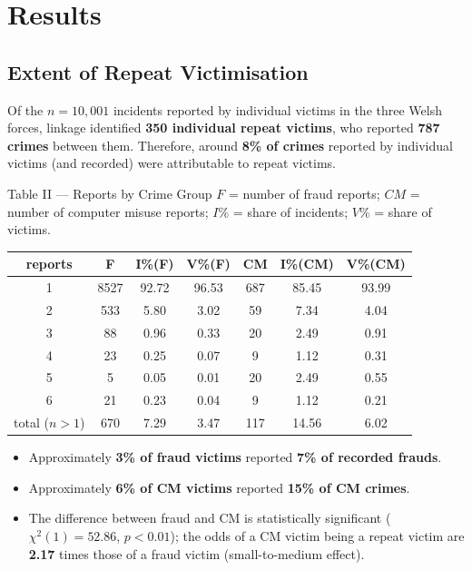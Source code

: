 \documentclass[11pt,a4paper,openany]{report}
\theoremstyle{definition}
\theoremstyle{plain}
\theoremstyle{remark}
\begin{document}
\section{Results}

\subsection{Extent of Repeat Victimisation}

Of the $n = 10{,}001$ incidents reported by individual victims in the three Welsh forces, linkage identified \textbf{350 individual repeat victims}, who reported \textbf{787 crimes} between them. Therefore, around \textbf{8\% of crimes} reported by individual victims (and recorded) were attributable to repeat victims.

\begin{datapanel}{Table II --- Reports by Crime Group}
$F$ = number of fraud reports; $CM$ = number of computer misuse reports; $I\%$ = share of incidents; $V\%$ = share of victims.
\begin{center}
\begin{tabular}{ccccccc}
\toprule
\textbf{reports} & \textbf{F} & \textbf{I\%(F)} & \textbf{V\%(F)} & \textbf{CM} & \textbf{I\%(CM)} & \textbf{V\%(CM)} \\
\midrule
1 & 8527 & 92.72 & 96.53 & 687 & 85.45 & 93.99 \\
2 & 533  & 5.80  & 3.02  & 59  & 7.34  & 4.04 \\
3 & 88   & 0.96  & 0.33  & 20  & 2.49  & 0.91 \\
4 & 23   & 0.25  & 0.07  & 9   & 1.12  & 0.31 \\
5 & 5    & 0.05  & 0.01  & 20  & 2.49  & 0.55 \\
6 & 21   & 0.23  & 0.04  & 9   & 1.12  & 0.21 \\
\midrule
total ($n>1$) & 670 & 7.29 & 3.47 & 117 & 14.56 & 6.02 \\
\bottomrule
\end{tabular}
\end{center}
\end{datapanel}

\begin{itemize}
    \item Approximately \textbf{3\% of fraud victims} reported \textbf{7\% of recorded frauds}.
    \item Approximately \textbf{6\% of CM victims} reported \textbf{15\% of CM crimes}.
    \item The difference between fraud and CM is statistically significant ($\chi^2(1) = 52.86$, $p < 0.01$); the odds of a CM victim being a repeat victim are \textbf{2.17} times those of a fraud victim (small-to-medium effect).
\end{itemize}
\end{document}

